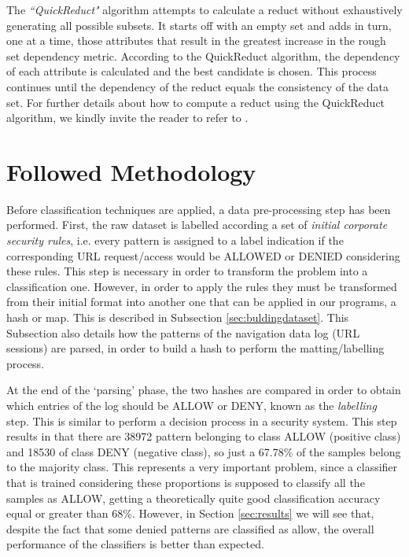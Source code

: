 \documentclass{llncs}
\begin{document}
The \emph{``QuickReduct"} algorithm  attempts to calculate a reduct without exhaustively generating all possible subsets. It starts off with an empty set and adds in turn, one at a time, those attributes that result in the greatest increase in the rough set dependency metric. According to the QuickReduct algorithm, the dependency of each attribute is calculated and the best candidate is chosen. This process continues until the dependency of the reduct equals the consistency of the data set.
For further details about how to compute a  reduct using the   QuickReduct algorithm, we kindly invite the reader to refer to  \cite{shen2007rough}.


%

\section{Followed Methodology}
\label{sec:methodology}

\noindent Before classification techniques are applied, a data
pre-processing step has been performed. First, the raw dataset is
labelled according a set of \textit{initial corporate security rules},
i.e. every pattern is assigned to a label indication if the
corresponding URL request/access would be ALLOWED or DENIED
considering these rules. This step is necessary in order to transform
the problem into a classification one. However, in order to apply the
rules they must be transformed from their initial format into another
one that can be applied in our programs, a hash or map. This is
described in Subsection
\ref{sec:buldingdataset}. This Subsection also details how the
patterns of the navigation data log (URL sessions) are parsed, in
order to build a hash to perform the matting/labelling process.

At the end of the `parsing' phase, the two hashes are compared in order to obtain which entries of the log should be ALLOW or DENY, known as the \textit{labelling} step. This is similar to perform a decision process in a security system. This step results in that there are 38972 pattern belonging to class ALLOW (positive class) and 18530 of class DENY (negative class), so just a 67.78\% of the samples belong to the majority class. This represents a very important problem, since a classifier that is trained considering these proportions is supposed to classify all the samples as ALLOW, getting a theoretically quite good classification accuracy equal or greater than 68\%. However, in Section \ref{sec:results} we will see that, despite the fact that some denied patterns are classified as allow, the overall performance of the classifiers is better than expected.
\end{document}
